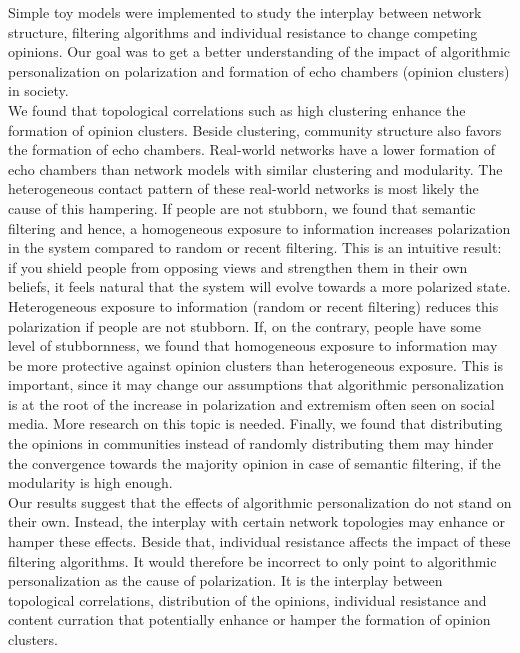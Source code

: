 \documentclass[11 pt , letterpaper , twoside , openright]{book}
\begin{document}
Simple toy models were implemented to study the interplay between network structure, filtering algorithms and individual resistance to change competing opinions. Our goal was to get a better understanding of the impact of algorithmic personalization on polarization and formation of echo chambers (opinion clusters) in society. \\
\newline
We found that topological correlations such as high clustering enhance the formation of opinion clusters. Beside clustering, community structure also favors the formation of echo chambers. Real-world networks have a lower formation of echo chambers than network models with similar clustering and modularity. The heterogeneous contact pattern of these real-world networks is most likely the cause of this hampering. If people are not stubborn, we found that semantic filtering and hence, a homogeneous exposure to information increases polarization in the system compared to random or recent filtering. This is an intuitive result: if you shield people from opposing views and strengthen them in their own beliefs, it feels natural that the system will evolve towards a more polarized state. Heterogeneous exposure to information (random or recent filtering) reduces this polarization if people are not stubborn. If, on the contrary, people have some level of stubbornness, we found that homogeneous exposure to information may be more protective against opinion clusters than heterogeneous exposure. This is important, since it may change our assumptions that algorithmic personalization is at the root of the increase in polarization and extremism often seen on social media. More research on this topic is needed. Finally, we found that distributing the opinions in communities instead of randomly distributing them may hinder the convergence towards the majority opinion in case of semantic filtering, if the modularity is high enough.\\
\newline
Our results suggest that the effects of algorithmic personalization do not stand on their own. Instead, the interplay with certain network topologies may enhance or hamper these effects. Beside that, individual resistance affects the impact of these filtering algorithms. It would therefore be incorrect to only point to algorithmic personalization as the cause of polarization. It is the interplay between topological correlations, distribution of the opinions, individual resistance and content curration that potentially enhance or hamper the formation of opinion clusters.
\end{document}
